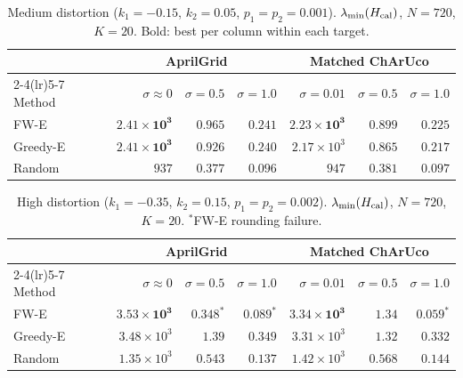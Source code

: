 \documentclass[11pt]{article}
\begin{document}
\begin{table}[ht]
\centering
\small
\caption{Medium distortion ($k_1{=}{-}0.15$, $k_2{=}0.05$, $p_1{=}p_2{=}0.001$).
$\lambda_{\min}(H_{\rm cal})$, $N{=}720$, $K{=}20$.
Bold: best per column within each target.}
\label{tab:distortion_medium}
\setlength{\tabcolsep}{4pt}
\begin{tabular}{lrrrrrr}
\toprule
 & \multicolumn{3}{c}{AprilGrid} & \multicolumn{3}{c}{Matched ChArUco} \\
\cmidrule(lr){2-4}\cmidrule(lr){5-7}
Method & $\sigma{\approx}0$ & $\sigma{=}0.5$ & $\sigma{=}1.0$ & $\sigma{=}0.01$ & $\sigma{=}0.5$ & $\sigma{=}1.0$ \\
\midrule
FW-E     & $\mathbf{2.41\!\times\!10^{3}}$ & $\mathbf{0.965}$ & $\mathbf{0.241}$ & $\mathbf{2.23\!\times\!10^{3}}$ & $\mathbf{0.899}$ & $\mathbf{0.225}$ \\
Greedy-E & $\mathbf{2.41\!\times\!10^{3}}$ & $0.926$ & $0.240$ & $2.17\!\times\!10^{3}$ & $0.865$ & $0.217$ \\
Random   & $937$ & $0.377$ & $0.096$ & $947$ & $0.381$ & $0.097$ \\
\bottomrule
\end{tabular}
\end{table}

\begin{table}[ht]
\centering
\small
\caption{High distortion ($k_1{=}{-}0.35$, $k_2{=}0.15$, $p_1{=}p_2{=}0.002$).
$\lambda_{\min}(H_{\rm cal})$, $N{=}720$, $K{=}20$.
${}^*$FW-E rounding failure.}
\label{tab:distortion_high}
\setlength{\tabcolsep}{4pt}
\begin{tabular}{lrrrrrr}
\toprule
 & \multicolumn{3}{c}{AprilGrid} & \multicolumn{3}{c}{Matched ChArUco} \\
\cmidrule(lr){2-4}\cmidrule(lr){5-7}
Method & $\sigma{\approx}0$ & $\sigma{=}0.5$ & $\sigma{=}1.0$ & $\sigma{=}0.01$ & $\sigma{=}0.5$ & $\sigma{=}1.0$ \\
\midrule
FW-E     & $\mathbf{3.53\!\times\!10^{3}}$ & $0.348^*$ & $0.089^*$ & $\mathbf{3.34\!\times\!10^{3}}$ & $\mathbf{1.34}$ & $0.059^*$ \\
Greedy-E & $3.48\!\times\!10^{3}$ & $\mathbf{1.39}$ & $\mathbf{0.349}$ & $3.31\!\times\!10^{3}$ & $1.32$ & $\mathbf{0.332}$ \\
Random   & $1.35\!\times\!10^{3}$ & $0.543$ & $0.137$ & $1.42\!\times\!10^{3}$ & $0.568$ & $0.144$ \\
\bottomrule
\end{tabular}
\end{table}
\end{document}
